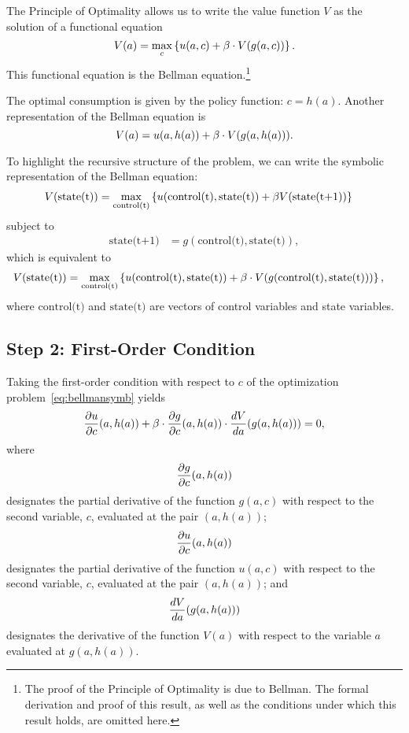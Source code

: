 \documentclass[letterpaper,12pt,leqno]{article}
\begin{document}
The Principle of Optimality allows us to write the value function $V$ as the solution of a functional equation
\begin{equation}
V(a)=\max_{c}\bc{u(a,c)+\b\cdot V(g(a,c))}.\label{eq:bellmansymb}
\end{equation}
This functional equation is the Bellman equation.\footnote{The proof of the Principle of Optimality is due to Bellman. The formal derivation and proof of this result, as well as the conditions under which this result holds, are omitted here.} 

The optimal consumption is given by the policy function: $c=h(a)$. Another representation of the Bellman equation is 
\begin{equation}
V(a)=u(a,h(a))+\beta\cdot V(g(a,h(a))).\label{eq:bellmansymb2}
\end{equation}

To highlight the recursive structure of the problem, we can write the symbolic representation of
the Bellman equation:
\begin{align*}
V(\text{state(t)})&= \max_{\text{control(t)}}\bc{u(\text{control(t)},\text{state(t)})+\b V(\text{state(t+1)})}
\end{align*}
subject to
\begin{align*}
\text{state(t+1)}&=g(\text{control(t)},\text{state(t)}),
\end{align*}
which is equivalent to
\begin{align*}
V(\text{state(t)})&= \max_{\text{control(t)}}\bc{u(\text{control(t)},\text{state(t)})+\b \cdot  V(g(\text{control(t)},\text{state(t)}))},
\end{align*}
where $\text{control(t)}$ and $\text{state(t)}$ are vectors of control variables and state variables.


\subsection{Step 2: First-Order Condition}

Taking the first-order condition with respect to $c$ of the optimization problem~\eqref{eq:bellmansymb} yields 
\begin{equation}
\frac{\partial u}{\partial c}(a,h(a))+\beta \cdot  \frac{\partial g}{\partial c}(a,h(a)) \cdot \frac{d V}{d a}(g(a,h(a)))=0,\label{eq:focsymb}
\end{equation}
where
\[\frac{\partial g}{\partial c}(a,h(a))\]
designates the partial derivative of the function $g(a,c)$ with respect to the second variable, $c$, evaluated at the pair $(a,h(a))$;
\[\frac{\partial u}{\partial c}(a,h(a))\]
designates the partial derivative of the function $u(a,c)$ with respect to the second variable, $c$, evaluated at the pair $(a,h(a))$;
and 
\[\frac{d V}{d a}(g(a,h(a)))\]
designates the derivative of the function $V(a)$ with respect to the variable $a$ evaluated at $g(a,h(a))$.
\end{document}
